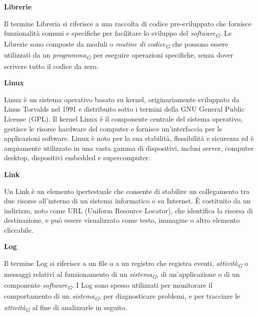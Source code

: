 \documentclass{article}
\begin{document}
\vspace{0.4cm}

\textbf{Librerie}

\vspace{0.1cm}

Il termine Libreria si riferisce a una raccolta di codice pre-sviluppato che fornisce funzionalità comuni e specifiche per facilitare lo sviluppo del \textit{software}\textsubscript{\textit{G}}. Le Librerie sono composte da moduli o \textit{routine di codice}\textsubscript{\textit{G}} che possono essere utilizzati da un \textit{programma}\textsubscript{\textit{G}} per eseguire operazioni specifiche, senza dover scrivere tutto il codice da zero.

\vspace{0.4cm}

\textbf{Linux}

\vspace{0.1cm}

Linux è un sistema operativo basato su kernel, originariamente sviluppato da Linus Torvalds nel 1991 e distribuito sotto i termini della GNU General Public License (GPL). Il kernel Linux è il componente centrale del sistema operativo, gestisce le risorse hardware del computer e fornisce un'interfaccia per le applicazioni software. Linux è noto per la sua stabilità, flessibilità e sicurezza ed è ampiamente utilizzato in una vasta gamma di dispositivi, inclusi server, computer desktop, dispositivi embedded e supercomputer. 

\vspace{0.4cm}

\textbf{Link}

\vspace{0.1cm}

Un Link è un elemento ipertestuale che consente di stabilire un collegamento tra due risorse all'interno di un sistema informatico o su Internet. È costituito da un indirizzo, noto come URL (Uniform Resource Locator), che identifica la risorsa di destinazione, e può essere visualizzato come testo, immagine o altro elemento cliccabile. 

\vspace{0.4cm}

\textbf{Log}

\vspace{0.1cm}

Il termine Log si riferisce a un file o a un registro che registra eventi, \textit{attività}\textsubscript{\textit{G}} o messaggi relativi al funzionamento di un \textit{sistema}\textsubscript{\textit{G}}, di un'applicazione o di un componente \textit{software}\textsubscript{\textit{G}}. I Log sono spesso utilizzati per monitorare il comportamento di un \textit{sistema}\textsubscript{\textit{G}}, per diagnosticare problemi, e per tracciare le \textit{attività}\textsubscript{\textit{G}} al fine di analizzarle in seguito.
\end{document}
